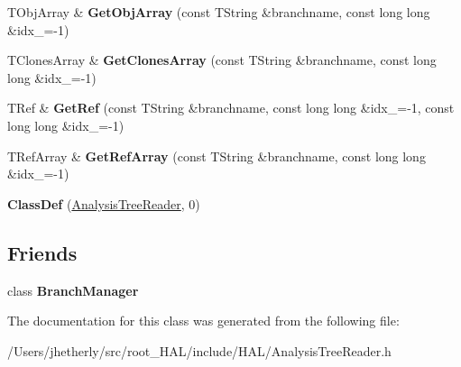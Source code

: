 \begin{DoxyCompactItemize}
\item 
\hypertarget{class_h_a_l_1_1_analysis_tree_reader_ad44870dd8478b8d404ede307726f2db6}{T\-Obj\-Array \& {\bfseries Get\-Obj\-Array} (const T\-String \&branchname, const long long \&idx\-\_=-\/1)}\label{class_h_a_l_1_1_analysis_tree_reader_ad44870dd8478b8d404ede307726f2db6}

\item 
\hypertarget{class_h_a_l_1_1_analysis_tree_reader_ae9115ce6bba555009b6b21eca20339c9}{T\-Clones\-Array \& {\bfseries Get\-Clones\-Array} (const T\-String \&branchname, const long long \&idx\-\_=-\/1)}\label{class_h_a_l_1_1_analysis_tree_reader_ae9115ce6bba555009b6b21eca20339c9}

\item 
\hypertarget{class_h_a_l_1_1_analysis_tree_reader_af010b9fafb8bd7f06efcaa46d1360253}{T\-Ref \& {\bfseries Get\-Ref} (const T\-String \&branchname, const long long \&idx\-\_=-\/1, const long long \&idx\-\_=-\/1)}\label{class_h_a_l_1_1_analysis_tree_reader_af010b9fafb8bd7f06efcaa46d1360253}

\item 
\hypertarget{class_h_a_l_1_1_analysis_tree_reader_a66bc43933f69938b94dd8caf5277395c}{T\-Ref\-Array \& {\bfseries Get\-Ref\-Array} (const T\-String \&branchname, const long long \&idx\-\_=-\/1)}\label{class_h_a_l_1_1_analysis_tree_reader_a66bc43933f69938b94dd8caf5277395c}

\item 
\hypertarget{class_h_a_l_1_1_analysis_tree_reader_ad8be72de7b7f4ae5ced82c636ac91dd1}{{\bfseries Class\-Def} (\hyperlink{class_h_a_l_1_1_analysis_tree_reader}{Analysis\-Tree\-Reader}, 0)}\label{class_h_a_l_1_1_analysis_tree_reader_ad8be72de7b7f4ae5ced82c636ac91dd1}

\end{DoxyCompactItemize}
\subsection*{Friends}
\begin{DoxyCompactItemize}
\item 
\hypertarget{class_h_a_l_1_1_analysis_tree_reader_a3b527c540b6431b5700a6d002214747c}{class {\bfseries Branch\-Manager}}\label{class_h_a_l_1_1_analysis_tree_reader_a3b527c540b6431b5700a6d002214747c}

\end{DoxyCompactItemize}


The documentation for this class was generated from the following file\-:\begin{DoxyCompactItemize}
\item 
/\-Users/jhetherly/src/root\-\_\-\-H\-A\-L/include/\-H\-A\-L/Analysis\-Tree\-Reader.\-h\end{DoxyCompactItemize}
